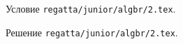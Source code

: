 \problem
Условие \texttt{regatta/junior/algbr/2.tex}.

\solution Решение \texttt{regatta/junior/algbr/2.tex}.
\endproblem
